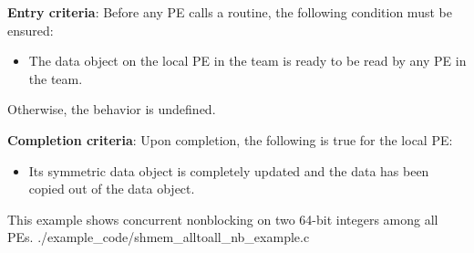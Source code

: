 \begin{apidefinition}
{    {\bf Entry criteria}: Before any \ac{PE} calls a  routine,
    the following condition must be ensured:
    \begin{itemize}
    \item The  data object on the local \ac{PE} in the team is
      ready to be read by any \ac{PE} in the team.
    \end{itemize}
    Otherwise, the behavior is undefined.

    {\bf Completion criteria}: Upon completion, the following is true for
    the local PE:
    \begin{itemize}
    \item Its  symmetric data object is completely updated and
    the data has been copied out of the  data object.
    \end{itemize}
}



\begin{apiexamples}

\apicexample
    {This \CorCpp{} example shows concurrent nonblocking  on two 64-bit integers among all \acp{PE}.}
    {./example_code/shmem_alltoall_nb_example.c}
    {}

\end{apiexamples}

\end{apidefinition}
